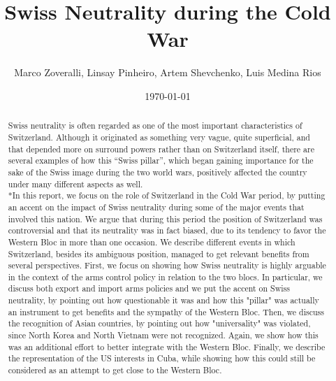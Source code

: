 \documentclass[a4paper]{article}
\title{Swiss Neutrality during the Cold War}
\author{Marco Zoveralli, Linsay Pinheiro, Artem Shevchenko, Luis Medina Rios}
\date{\today}
\begin{document}
\maketitle

\begin{abstract}Swiss neutrality is often regarded as one of the most important characteristics of Switzerland. Although it originated as something very vague, quite superficial, and that depended more on surround powers rather than on  Switzerland itself, there are several examples of how this “Swiss pillar”, which began gaining importance for the sake of the Swiss image during the two world wars, positively affected the country under many different aspects as well. 
\\*In this report, we focus on the role of Switzerland in the Cold War period, by putting an accent on the impact of Swiss neutrality during some of the major events that involved this nation. We argue that during this period the position of Switzerland was controversial and that its neutrality was in fact biased, due to its tendency to favor the Western Bloc in more than one occasion. 
We describe different events in which Switzerland, besides its ambiguous position, managed to get relevant benefits from several perspectives. First, we focus on showing how Swiss neutrality is highly arguable in the context of the arms control policy in relation to the two blocs. In particular, we discuss both export and import arms policies and we put the accent on Swiss neutrality, by pointing out how questionable it was and how this "pillar" was actually an instrument to get benefits and the sympathy of the Western Bloc. 
Then, we discuss the recognition of Asian countries, by pointing out how "universality" was violated, since North Korea and North Vietnam were not recognized. Again, we show how this was an additional effort to better integrate with the Western Bloc.
Finally, we describe the representation of the US interests in Cuba, while showing how this could still be considered as an attempt to get close to the Western Bloc.
\end{abstract}

\clearpage

\tableofcontents

\clearpage
\end{document}
